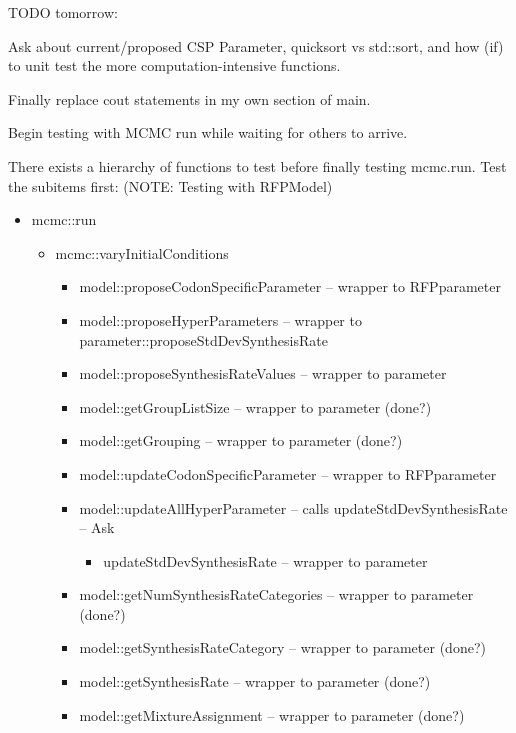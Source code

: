 \documentclass[12pt,hyperref]{labbook}
\newcommand{\sep}{\discretionary{}{}{}} %
\begin{document}
TODO tomorrow:

Ask about current/proposed CSP Parameter, quicksort vs std::sort, and how (if) to unit test
the more computation-intensive functions.

Finally replace cout statements in my own section of main.

Begin testing with MCMC run while waiting for others to arrive.


There exists a hierarchy of functions to test before finally testing mcmc.run. Test the
subitems first: (NOTE: Testing with RFPModel)
\begin{itemize}
    \item mcmc::run
    \begin{itemize}
        \item mcmc::varyInitialConditions
        \begin{itemize}
            \item model::proposeCodonSpecificParameter -- wrapper to RFPparameter
            \item model::\sep propose\sep Hyper\sep Parameters -- wrapper to
            parameter::\sep propose\sep Std\sep Dev\sep Synthesis\sep Rate
            \item model::proposeSynthesisRateValues -- wrapper to parameter
            \item model::getGroupListSize -- wrapper to parameter (done?)
            \item model::getGrouping -- wrapper to parameter (done?)
            \item model::updateCodonSpecificParameter -- wrapper to RFPparameter
            \item model::\sep update\sep All\sep Hyper\sep Parameter -- 
            calls update\sep Std\sep Dev\sep Synthesis\sep Rate -- Ask
            \begin{itemize}
                \item updateStdDevSynthesisRate -- wrapper to parameter
            \end{itemize}
            \item model::getNumSynthesisRateCategories -- wrapper to parameter (done?)
            \item model::getSynthesisRateCategory -- wrapper to parameter (done?)
            \item model::getSynthesisRate -- wrapper to parameter (done?)
            \item model::getMixtureAssignment -- wrapper to parameter (done?)

\end{itemize}
\end{itemize}
\end{itemize}
\end{document}
